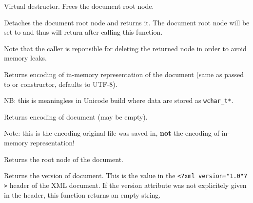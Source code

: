 Virtual destructor. Frees the document root node.



\label{wxxmldocumentdetachroot}


Detaches the document root node and returns it. The document root node will be set to \NULL
and thus  will return \false after calling this function.

Note that the caller is reponsible for deleting the returned node in order to avoid memory leaks.



\label{wxxmldocumentgetencoding}


Returns encoding of in-memory representation of the document
(same as passed to  or constructor, defaults to UTF-8).

NB: this is meaningless in Unicode build where data are stored as {\tt wchar\_t*}.



\label{wxxmldocumentgetfileencoding}


Returns encoding of document (may be empty).

Note: this is the encoding original file was saved in, {\bf not} the
encoding of in-memory representation!



\label{wxxmldocumentgetroot}


Returns the root node of the document.



\label{wxxmldocumentgetversion}


Returns the version of document.
This is the value in the {\tt <?xml version="1.0"?>} header of the XML document.
If the version attribute was not explicitely given in the header, this function
returns an empty string.



\label{wxxmldocumentisok}


